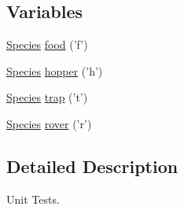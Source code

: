 \subsection*{Variables}
\begin{DoxyCompactItemize}
\item 
\hyperlink{classSpecies}{Species} \hyperlink{TestDarwin_8c_09_09_a8c60728add7fcdd3a5ef80ae0905e6b7}{food} ('f')
\item 
\hyperlink{classSpecies}{Species} \hyperlink{TestDarwin_8c_09_09_a4e4fdf910ee2a8bb190947a1eda3c0ef}{hopper} ('h')
\item 
\hyperlink{classSpecies}{Species} \hyperlink{TestDarwin_8c_09_09_a4f7a8b125c7588a210de545ead5ca730}{trap} ('t')
\item 
\hyperlink{classSpecies}{Species} \hyperlink{TestDarwin_8c_09_09_af895801849c619e0a4fd6d9d6f15fbc1}{rover} ('r')
\end{DoxyCompactItemize}


\subsection{Detailed Description}
Unit Tests. 

